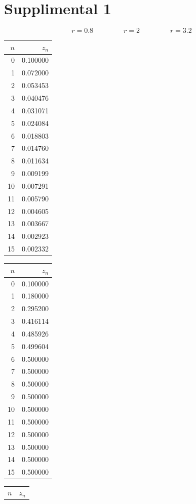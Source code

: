 \documentclass[11pt, letterpaper]{report}
\begin{document}
\section*{Supplimental 1}
\begin{center}
	\[
		r=0.8\qquad\qquad\; r=2\qquad\qquad\; r=3.2
	\]
	\begin{tabular}{rr}
\toprule
$n$ & $z_n$ \\
\midrule
0 & 0.100000 \\
1 & 0.072000 \\
2 & 0.053453 \\
3 & 0.040476 \\
4 & 0.031071 \\
5 & 0.024084 \\
6 & 0.018803 \\
7 & 0.014760 \\
8 & 0.011634 \\
9 & 0.009199 \\
10 & 0.007291 \\
11 & 0.005790 \\
12 & 0.004605 \\
13 & 0.003667 \\
14 & 0.002923 \\
15 & 0.002332 \\
\bottomrule
\end{tabular}
\begin{tabular}{rr}
\toprule
$n$ & $z_n$ \\
\midrule
0 & 0.100000 \\
1 & 0.180000 \\
2 & 0.295200 \\
3 & 0.416114 \\
4 & 0.485926 \\
5 & 0.499604 \\
6 & 0.500000 \\
7 & 0.500000 \\
8 & 0.500000 \\
9 & 0.500000 \\
10 & 0.500000 \\
11 & 0.500000 \\
12 & 0.500000 \\
13 & 0.500000 \\
14 & 0.500000 \\
15 & 0.500000 \\
\bottomrule
\end{tabular}
\begin{tabular}{rr}
\toprule
$n$ & $z_n$ \\

\end{tabular}
\end{center}
\end{document}
